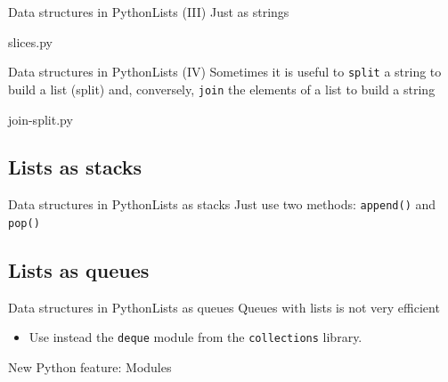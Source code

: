 \documentclass[10pt,compress]{beamer} %
\begin{document}
\begin{frame}[shrink]{Data structures in Python}{Lists (III)}
Just as strings
\scriptsize{
		\begin{block}{slices.py}
		\vspace{-0.4cm}
		
		\vspace{-0.2cm}
		\end{block}
		}
\end{frame}

\begin{frame}[shrink]{Data structures in Python}{Lists (IV)}
Sometimes it is useful to \texttt{split} a string to build a list (split) and, conversely, \texttt{join} the elements of a list to build a string
\scriptsize{
		\begin{block}{join-split.py}
		
		\end{block}
		}
\end{frame}


\subsection{Lists as stacks}
\begin{frame}[shrink]{Data structures in Python}{Lists as stacks}
	Just use two methods: \texttt{append()} and \texttt{pop()}
\scriptsize{
		\begin{block}{}
		\vspace{-0.4cm}
		
		\vspace{-0.2cm}
		\end{block}
		}
\end{frame}

\subsection{Lists as queues}
\begin{frame}[shrink]{Data structures in Python}{Lists as queues}
	Queues with lists is not very efficient
	\begin{itemize}
	\item Use instead the \texttt{deque} module from the \texttt{collections} library.
	\end{itemize}
	\normalsize{
		\begin{block}{}
		\vspace{-0.2cm}
		
		\vspace{-0.2cm}
		\end{block}
		}
	\normalsize{New Python feature: Modules}
\end{frame}
\end{document}

